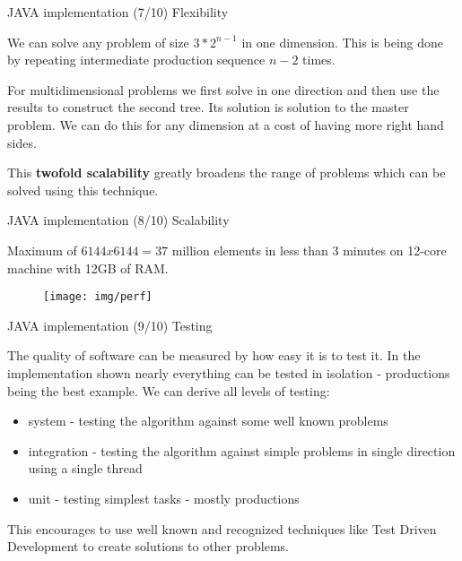 \documentclass[c]{beamer}
\begin{document}
\begin{frame}{JAVA implementation (7/10) Flexibility}

We can solve any problem of size $3*2^{n-1}$ in one dimension. This is being done by repeating intermediate production sequence $n-2$ times.

\vskip 0.1in

For multidimensional problems we first solve in one direction and then use the results to construct the second tree. Its solution is solution to the master problem. We can do this for any dimension at a cost of having more right hand sides.

\vskip 0.1in

This \textbf{twofold scalability} greatly broadens the range of problems which can be solved using this technique. 

\end{frame}


\begin{frame}{JAVA implementation (8/10) Scalability}

Maximum of $6144x6144=37$ million elements in less than 3 minutes on 12-core machine with 12GB of RAM.

\vskip 0.1in

   \begin{figure}
      \centering
      \texttt{[image: img/perf]}
    \end{figure}

\end{frame}


\begin{frame}{JAVA implementation (9/10) Testing}

The quality of software can be measured by how easy it is to test it.
\vskip 0.1in
In the implementation shown nearly everything can be tested in isolation - productions being the best example.
\vskip 0.1in
We can derive all levels of testing:
\begin{itemize}
  \item system - testing the algorithm against some well known problems
  \item integration - testing the algorithm against simple problems in single direction using a single thread
  \item unit - testing simplest tasks - mostly productions
\end{itemize}
\vskip 0.2in
This encourages to use well known and recognized techniques like Test Driven Development to create solutions to other problems.


\end{frame}
\end{document}
